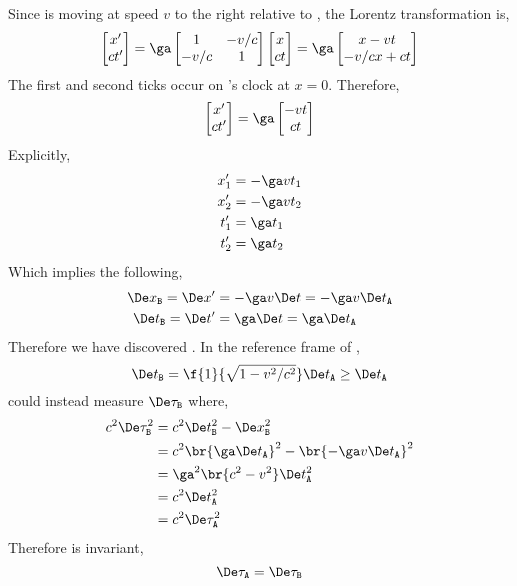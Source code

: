 \documentclass{article}
\begin{document}
Since  is moving at speed $v$ to the right relative to , the Lorentz transformation is,
\[ \sqm{x' \\ ct'} = \ga\sqm{1 & -v / c \\ -v /c & 1} \sqm{x \\ ct} = \ga \sqm{x - v t \\ - v /c x + c t} \]
The first and second ticks occur on 's clock at $x = 0$. Therefore,
\[ \sqm{x' \\ ct'} = \ga \sqm{- v t \\ c t} \]
Explicitly,
\begin{align*}
x'_1 &= -\ga v t_1 \\
x'_2 &= -\ga v t_2 \\
t'_1 &= \ga t_1 \\
t'_2 &= \ga t_2
\end{align*}
Which implies the following,
\begin{align*}
\De x_{\p{B}} = \De x' &= -\ga v \De t = -\ga v \De t_{\p{A}} \\
\De t_{\p{B}} = \De t' &= \ga \De t = \ga \De t_{\p{A}}
\end{align*}
Therefore we have discovered . In the reference frame of ,
\[ \De t_{\p{B}} = \f{1}{\sqrt{1 - v^2 /c^2}} \De t_{\p{A}} \geq \De t_{\p{A}}\]
 could instead measure $\De \tau_{\p{B}}$ where,
\begin{align*}
c^2\De \tau_\p{B}^2
&= c^2 \De t_\p{B}^2 - \De x_\p{B}^2 \\
&= c^2 \br{\ga \De t_{\p{A}}}^2 - \br{-\ga v \De t_{\p{A}}}^2 \\
&= \ga^2 \br{c^2 - v^2}\De t_{\p{A}}^2 \\
&= c^2 \De t_{\p{A}}^2 \\
&= c^2 \De \tau_{\p{A}}^2
\end{align*}
Therefore  is invariant,
\[ \De \tau_{\p{A}} = \De \tau_{\p{B}} \]
\end{document}
